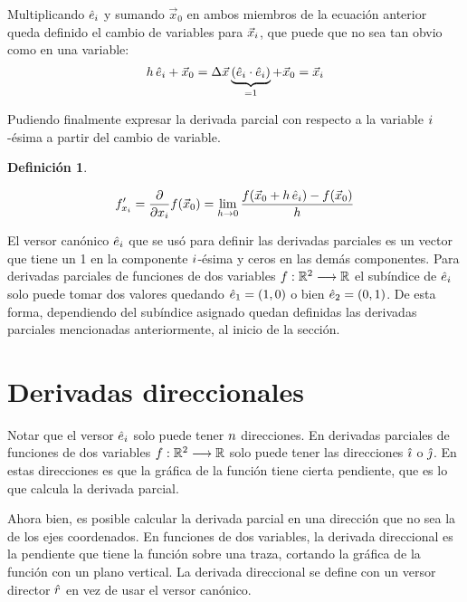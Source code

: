 \documentclass[a5paper,12pt,twoside]{book}
\newtheorem{defn}{{Definición}}[chapter]
\begin{document}
Multiplicando $\hat{e}_i$ y sumando $\Vec{x}_0$ en ambos miembros de la ecuación anterior queda definido el cambio de variables para $\Vec{x}_i$, que puede que no sea tan obvio como en una variable:
\begin{equation*}
    h \, \hat{e}_i + \Vec{x}_0 = \Delta \Vec{x} \underbrace{\left( \hat{e}_i \cdot \hat{e}_i \right)}_{=1} + \Vec{x}_0 = \Vec{x}_i
\end{equation*}

Pudiendo finalmente expresar la derivada parcial con respecto a la variable $i$-ésima a partir del cambio de variable.

\begin{mdframed}[style=MyFrame1]
    \begin{defn}
    \end{defn}
    \begin{equation*}
    f_{x_i}'
    = \frac{\partial}{\partial x_i} f(\Vec{x}_0)
    = \lim_{h \to 0} \frac{f(\Vec{x}_0 + h\,\hat{e}_i) - f(\Vec{x}_0)}{h}
\end{equation*}
\end{mdframed}

El versor canónico $\hat{e}_i$ que se usó para definir las derivadas parciales es un vector que tiene un 1 en la componente $i$-ésima y ceros en las demás componentes. Para derivadas parciales de funciones de dos variables $f:\mathbb{R}^2 \longrightarrow \mathbb{R}$ el subíndice de $\hat{e}_i$ solo puede tomar dos valores quedando $\hat{e}_1=(1,0)$ o bien $\hat{e}_2=(0,1)$. De esta forma, dependiendo del subíndice asignado quedan definidas las derivadas parciales mencionadas anteriormente, al inicio de la sección.

    
\section{Derivadas direccionales}

Notar que el versor $\hat{e}_i$ solo puede tener $n$ direcciones. En derivadas parciales de funciones de dos variables $f:\mathbb{R}^2 \longrightarrow \mathbb{R}$ solo puede tener las direcciones $\hat{\imath}$ o $\hat{\jmath}$. En estas direcciones es que la gráfica de la función tiene cierta pendiente, que es lo que calcula la derivada parcial.

Ahora bien, es posible calcular la derivada parcial en una dirección que no sea la de los ejes coordenados. En funciones de dos variables, la derivada direccional es la pendiente que tiene la función sobre una traza, cortando la gráfica de la función con un plano vertical. La derivada direccional se define con un versor director $\hat{r}$ en vez de usar el versor canónico.
\end{document}
